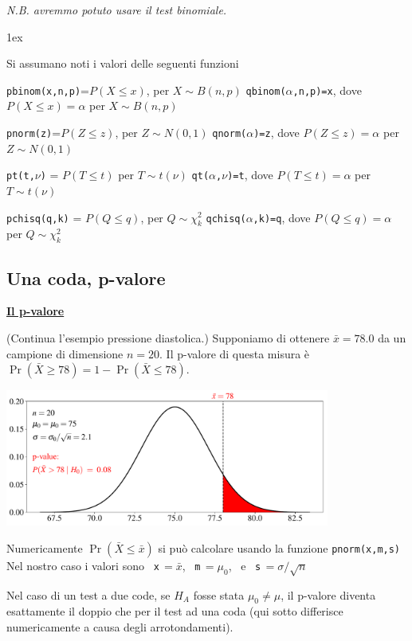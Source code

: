 \documentclass[12pt,openany]{book}
\theoremstyle{mio}
\theoremstyle{liscio}
\begin{document}
\textit{N.B. avremmo potuto usare il test binomiale.}

\parskip1ex
{\hrulefill\scriptsize

Si assumano noti i valori delle seguenti funzioni

{\tt pbinom(x,n,p)}=$P(X\le x)$, per $X\sim B(n,p)$
\hfill 
{\tt qbinom($\alpha$,n,p)=x},  dove $P(X\le x)=\alpha$ per $X\sim B(n,p)$

{\tt pnorm(z)}=$P(Z\le z)$, per $Z\sim N(0,1)$
\hfill 
{\tt qnorm($\alpha$)=z},  dove $P(Z\le z)=\alpha$ per $Z\sim N(0,1)$

{\tt pt(t,$\nu$)} = $P(T\le t)$ per $T\sim t(\nu)$
\hfill
{\tt qt($\alpha$,$\nu$)=t}, dove $P(T\le t)=\alpha$ per $T\sim t(\nu)$

{\tt pchisq(q,k)} = $P(Q\le q)$, per $Q\sim \chi^2_k$
\hfill
{\tt qchisq($\alpha$,k)=q},  dove $P(Q\le q)=\alpha$ per $Q\sim \chi^2_k$
\par
}


\hfill{}\clearpage\subsection{Una coda, p-valore}
\hfill\textbf{{\color{brown}\hyperref[pvalore]{Il p-valore \faShare}}}

(Continua l'esempio pressione diastolica.) Supponiamo di ottenere $\bar x=78.0$ da un campione di dimensione $n=20$. Il p-valore di questa misura è $\Pr(\bar X\ge 78)=1-\Pr(\bar X\le 78)$.

\hfil\includegraphics[width=0.8\textwidth]{figure/Z-test-p-val_01.pdf}

Numericamente $\Pr(\bar X\le \bar x)$ si può calcolare usando la funzione {\tt pnorm(x,m,s)} Nel nostro caso i valori sono \ {\tt x}$\,=\bar x$,  \ {\tt m}$\,=\mu_0$, \ e  \ {\tt s}$\,=\sigma/\sqrt{n}$

Nel caso di un test a due code, se $H_A$ fosse stata $\mu_0\neq\mu$, il p-valore diventa esattamente il doppio che per il test ad una coda (qui sotto differisce numericamente a causa degli arrotondamenti). 
\end{document}
